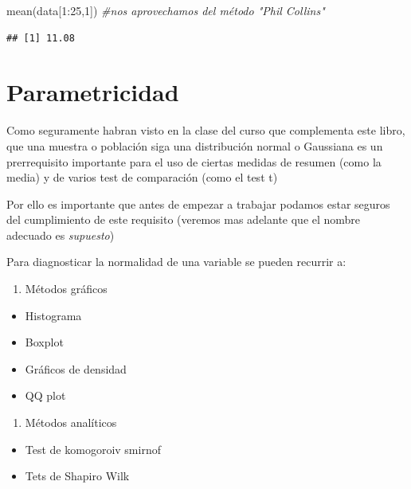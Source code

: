 \documentclass[
]{book}
\newenvironment{Shaded}{\begin{snugshade}}{\end{snugshade}}
\newcommand{\CommentTok}[1]{\textcolor[rgb]{0.56,0.35,0.01}{\textit{#1}}}
\newcommand{\DecValTok}[1]{\textcolor[rgb]{0.00,0.00,0.81}{#1}}
\newcommand{\FunctionTok}[1]{\textcolor[rgb]{0.00,0.00,0.00}{#1}}
\newcommand{\NormalTok}[1]{#1}
\newcommand{\SpecialCharTok}[1]{\textcolor[rgb]{0.00,0.00,0.00}{#1}}
\providecommand{\tightlist}{%
  \setlength{\itemsep}{0pt}\setlength{\parskip}{0pt}}
\begin{document}
\begin{Shaded}
\begin{Highlighting}[]
\FunctionTok{mean}\NormalTok{(data[}\DecValTok{1}\SpecialCharTok{:}\DecValTok{25}\NormalTok{,}\DecValTok{1}\NormalTok{]) }\CommentTok{\#nos aprovechamos del método "Phil Collins"}
\end{Highlighting}
\end{Shaded}

\begin{verbatim}
## [1] 11.08
\end{verbatim}

\hypertarget{parametricidad}{%
\section{Parametricidad}\label{parametricidad}}

Como seguramente habran visto en la clase del curso que complementa este libro, que una muestra o población siga una distribución normal o Gaussiana es un prerrequisito importante para el uso de ciertas medidas de resumen (como la media) y de varios test de comparación (como el test t)

Por ello es importante que antes de empezar a trabajar podamos estar seguros del cumplimiento de este requisito (veremos mas adelante que el nombre adecuado es \emph{supuesto})

Para diagnosticar la normalidad de una variable se pueden recurrir a:

\begin{enumerate}
\def\labelenumi{\arabic{enumi}.}
\tightlist
\item
  Métodos gráficos
\end{enumerate}

\begin{itemize}
\tightlist
\item
  Histograma
\item
  Boxplot
\item
  Gráficos de densidad
\item
  QQ plot
\end{itemize}

\begin{enumerate}
\def\labelenumi{\arabic{enumi}.}
\setcounter{enumi}{1}
\tightlist
\item
  Métodos analíticos
\end{enumerate}

\begin{itemize}
\tightlist
\item
  Test de komogoroiv smirnof
\item
  Tets de Shapiro Wilk
\end{itemize}
\end{document}
